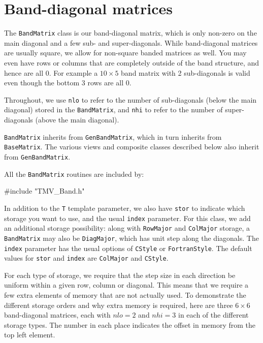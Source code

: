 \documentclass[twoside,letterpaper,11pt]{article}
\renewcommand{\tt}[1]{{\lstinline {#1}}}
\begin{document}
\newpage
\section{Band-diagonal matrices}
\label{BandMatrix}

The \tt{BandMatrix} class is our band-diagonal matrix, which is only non-zero
on the main diagonal and a few sub- and super-diagonals.  While band-diagonal
matrices are usually square, we allow for non-square banded matrices as well.
You may even have rows or columns that are completely outside of the 
band structure, and hence are all 0.  For example a $10\times 5$ band matrix
with 2 sub-diagonals is valid even though the bottom 3 rows are all 0.

Throughout, we use \tt{nlo} to refer to the number of sub-diagonals 
(below the main diagonal) stored
in the \tt{BandMatrix}, and \tt{nhi} to refer to the number of super-diagonals
(above the main diagonal).

\tt{BandMatrix} inherits from \tt{GenBandMatrix}, which in turn inherits from
\tt{BaseMatrix}.  
The various views and composite classes described below 
also inherit from \tt{GenBandMatrix}.

All the \tt{BandMatrix} routines are included by:
\begin{tmvcode}
#include "TMV_Band.h"
\end{tmvcode}

In addition to the \tt{T} template parameter, we also have \tt{stor} to indicate 
which storage you want to use, and the usual \tt{index} parameter.
For this class, we add an additional storage possibility:
along with \tt{RowMajor} and 
\tt{ColMajor} storage, a \tt{BandMatrix} may also be \tt{DiagMajor}, which 
has unit step along the diagonals.  The \tt{index} parameter has the usual
options of \tt{CStyle} or \tt{FortranStyle}.
The default values for \tt{stor} and \tt{index} are \tt{ColMajor} and \tt{CStyle}.

For each type of storage, we require that the step size in each direction
be uniform within a given row, column or diagonal. 
This means that we require a few extra elements
of memory that are not actually used.
To demonstrate the different storage orders and why extra memory is required, 
here are three $6 \times 6$ band-diagonal
matrices, each with $nlo = 2$ and $nhi = 3$ in each of the different storage
types.  The number in each place indicates the offset in memory from the 
top left element.
\end{document}
